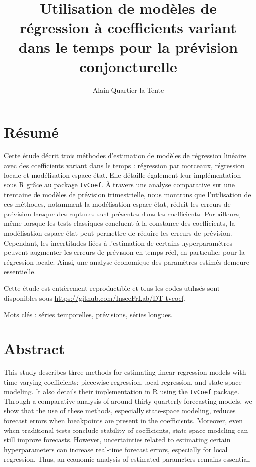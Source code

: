 \documentclass[
  a4paper,
  DIV=11,
  numbers=noendperiod,
  french]{scrartcl}
\title{Utilisation de modèles de régression à coefficients variant dans
le temps pour la prévision conjoncturelle}
\author{Alain Quartier-la-Tente}
\date{}
\newcommand\1{{\mathds 1}}
\renewcommand*\contentsname{Table des matières}
\newcommand\contentsname{Table des matières}
\theoremstyle{remark}
\begin{document}
\maketitle

\renewcommand*\contentsname{Table des matières}
{
\hypersetup{linkcolor=}
\setcounter{tocdepth}{3}
\tableofcontents
}
\newpage

\section*{Résumé}\label{ruxe9sumuxe9}

Cette étude décrit trois méthodes d'estimation de modèles de régression
linéaire avec des coefficients variant dans le temps : régression par
morceaux, régression locale et modélisation espace-état. Elle détaille
également leur implémentation sous R grâce au package \texttt{tvCoef}. À
travers une analyse comparative sur une trentaine de modèles de
prévision trimestrielle, nous montrons que l'utilisation de ces
méthodes, notamment la modélisation espace-état, réduit les erreurs de
prévision lorsque des ruptures sont présentes dans les coefficients. Par
ailleurs, même lorsque les tests classiques concluent à la constance des
coefficients, la modélisation espace-état peut permettre de réduire les
erreurs de prévision. Cependant, les incertitudes liées à l'estimation
de certains hyperparamètres peuvent augmenter les erreurs de prévision
en temps réel, en particulier pour la régression locale. Ainsi, une
analyse économique des paramètres estimés demeure essentielle.

Cette étude est entièrement reproductible et tous les codes utilisés
sont disponibles sous \url{https://github.com/InseeFrLab/DT-tvcoef}.

Mots clés : séries temporelles, prévisions, séries longues.

\section*{Abstract}\label{abstract}

This study describes three methods for estimating linear regression
models with time-varying coefficients: piecewise regression, local
regression, and state-space modeling. It also details their
implementation in R using the \texttt{tvCoef} package. Through a
comparative analysis of around thirty quarterly forecasting models, we
show that the use of these methods, especially state-space modeling,
reduces forecast errors when breakpoints are present in the
coefficients. Moreover, even when traditional tests conclude stability
of coefficients, state-space modeling can still improve forecasts.
However, uncertainties related to estimating certain hyperparameters can
increase real-time forecast errors, especially for local regression.
Thus, an economic analysis of estimated parameters remains essential.
\end{document}
